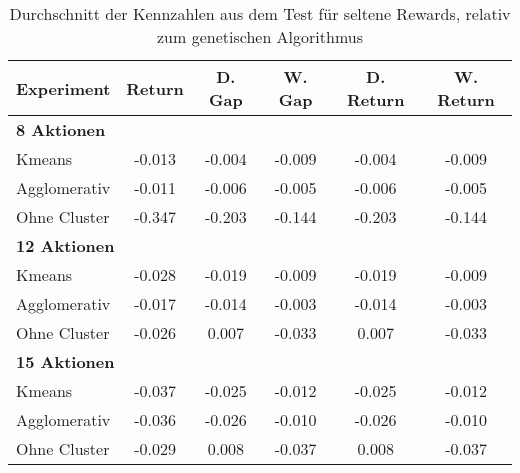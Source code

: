 \begin{table}[ht]
\centering
\caption{Durchschnitt der Kennzahlen aus dem Test für seltene Rewards, relativ zum genetischen Algorithmus}
\begin{tabular}{lccccc}
\hline
\textbf{Experiment} & \textbf{Return} & \textbf{D. Gap} & \textbf{W. Gap} & \textbf{D. Return} & \textbf{W. Return} \\
\hline
\multicolumn{6}{l}{\textbf{8 Aktionen}} \\
\hspace{1em}Kmeans & -0.013 & -0.004 & -0.009 & -0.004 & -0.009 \\
\hspace{1em}Agglomerativ & -0.011 & -0.006 & -0.005 & -0.006 & -0.005 \\
\hspace{1em}Ohne Cluster & -0.347 & -0.203 & -0.144 & -0.203 & -0.144 \\
\hline
\multicolumn{6}{l}{\textbf{12 Aktionen}} \\
\hspace{1em}Kmeans & -0.028 & -0.019 & -0.009 & -0.019 & -0.009 \\
\hspace{1em}Agglomerativ & -0.017 & -0.014 & -0.003 & -0.014 & -0.003 \\
\hspace{1em}Ohne Cluster & -0.026 & 0.007 & -0.033 & 0.007 & -0.033 \\
\hline
\multicolumn{6}{l}{\textbf{15 Aktionen}} \\
\hspace{1em}Kmeans & -0.037 & -0.025 & -0.012 & -0.025 & -0.012 \\
\hspace{1em}Agglomerativ & -0.036 & -0.026 & -0.010 & -0.026 & -0.010 \\
\hspace{1em}Ohne Cluster & -0.029 & 0.008 & -0.037 & 0.008 & -0.037 \\
\hline
\end{tabular}
\end{table}


